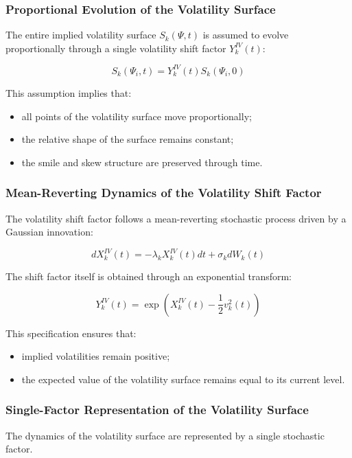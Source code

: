 \subsubsection{Proportional Evolution of the Volatility Surface}

The entire implied volatility surface $S_k(\Psi,t)$ is assumed to evolve proportionally through a single volatility shift factor $Y_k^{IV}(t)$:

\[
S_k(\Psi_i,t) = Y_k^{IV}(t) S_k(\Psi_i,0)
\]

This assumption implies that:

\begin{itemize}
	\item all points of the volatility surface move proportionally;
	\item the relative shape of the surface remains constant;
	\item the smile and skew structure are preserved through time.
\end{itemize}

\subsubsection{Mean-Reverting Dynamics of the Volatility Shift Factor}

The volatility shift factor follows a mean-reverting stochastic process driven by a Gaussian innovation:

\[
dX_k^{IV}(t) = -\lambda_k X_k^{IV}(t) dt + \sigma_k dW_k(t)
\]

The shift factor itself is obtained through an exponential transform:

\[
Y_k^{IV}(t) = \exp\left(X_k^{IV}(t) - \frac{1}{2}v_k^2(t)\right)
\]

This specification ensures that:

\begin{itemize}
	\item implied volatilities remain positive;
	\item the expected value of the volatility surface remains equal to its current level.
\end{itemize}

\subsubsection{Single-Factor Representation of the Volatility Surface}

The dynamics of the volatility surface are represented by a single stochastic factor.

